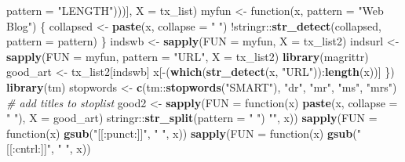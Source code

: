 \documentclass[12pt,]{article}
\newenvironment{Shaded}{\begin{snugshade}}{\end{snugshade}}
\newcommand{\KeywordTok}[1]{\textcolor[rgb]{0.13,0.29,0.53}{\textbf{{#1}}}}
\newcommand{\DataTypeTok}[1]{\textcolor[rgb]{0.13,0.29,0.53}{{#1}}}
\newcommand{\StringTok}[1]{\textcolor[rgb]{0.31,0.60,0.02}{{#1}}}
\newcommand{\CommentTok}[1]{\textcolor[rgb]{0.56,0.35,0.01}{\textit{{#1}}}}
\newcommand{\NormalTok}[1]{{#1}}
\begin{document}
\begin{Shaded}
\begin{Highlighting}[]
    \DataTypeTok{pattern =} \StringTok{"LENGTH"}\NormalTok{)))], }\DataTypeTok{X =} \NormalTok{tx_list)}
\NormalTok{myfun <-}\StringTok{ }\NormalTok{function(x, }\DataTypeTok{pattern =} \StringTok{"Web Blog"}\NormalTok{) \{}
    \NormalTok{collapsed <-}\StringTok{ }\KeywordTok{paste}\NormalTok{(x, }\DataTypeTok{collapse =} \StringTok{" "}\NormalTok{)}
    \NormalTok{!stringr::}\KeywordTok{str_detect}\NormalTok{(collapsed, }\DataTypeTok{pattern =} \NormalTok{pattern)}
\NormalTok{\}}
\NormalTok{indswb <-}\StringTok{ }\KeywordTok{sapply}\NormalTok{(}\DataTypeTok{FUN =} \NormalTok{myfun, }\DataTypeTok{X =} \NormalTok{tx_list2)}
\NormalTok{indsurl <-}\StringTok{ }\KeywordTok{sapply}\NormalTok{(}\DataTypeTok{FUN =} \NormalTok{myfun, }\DataTypeTok{pattern =} \StringTok{"URL"}\NormalTok{, }\DataTypeTok{X =} \NormalTok{tx_list2)}
\KeywordTok{library}\NormalTok{(magrittr)}
\NormalTok{good_art <-}\StringTok{ }\NormalTok{tx_list2[indswb] %
    \NormalTok{x[-(}\KeywordTok{which}\NormalTok{(}\KeywordTok{str_detect}\NormalTok{(x, }\StringTok{"URL"}\NormalTok{)):}\KeywordTok{length}\NormalTok{(x))]}
\NormalTok{\})}
\KeywordTok{library}\NormalTok{(tm)}
\NormalTok{stopwords <-}\StringTok{ }\KeywordTok{c}\NormalTok{(tm::}\KeywordTok{stopwords}\NormalTok{(}\StringTok{"SMART"}\NormalTok{), }\StringTok{"dr"}\NormalTok{, }\StringTok{"mr"}\NormalTok{, }\StringTok{"ms"}\NormalTok{, }\StringTok{"mrs"}\NormalTok{)  }\CommentTok{# add titles to stoplist}
\NormalTok{good2 <-}\StringTok{ }\KeywordTok{sapply}\NormalTok{(}\DataTypeTok{FUN =} \NormalTok{function(x) }\KeywordTok{paste}\NormalTok{(x, }\DataTypeTok{collapse =} \StringTok{" "}\NormalTok{), }\DataTypeTok{X =} \NormalTok{good_art) %
\StringTok{    }\NormalTok{stringr::}\KeywordTok{str_split}\NormalTok{(}\DataTypeTok{pattern =} \StringTok{" "}\NormalTok{) %
    \StringTok{""}\NormalTok{, x)) %
\KeywordTok{sapply}\NormalTok{(}\DataTypeTok{FUN =} \NormalTok{function(x) }\KeywordTok{gsub}\NormalTok{(}\StringTok{"[[:punct:]]"}\NormalTok{, }\StringTok{" "}\NormalTok{, x)) %
\KeywordTok{sapply}\NormalTok{(}\DataTypeTok{FUN =} \NormalTok{function(x) }\KeywordTok{gsub}\NormalTok{(}\StringTok{"[[:cntrl:]]"}\NormalTok{, }\StringTok{" "}\NormalTok{, x)) %
}}}}}}
\end{Highlighting}
\end{Shaded}
\end{document}
